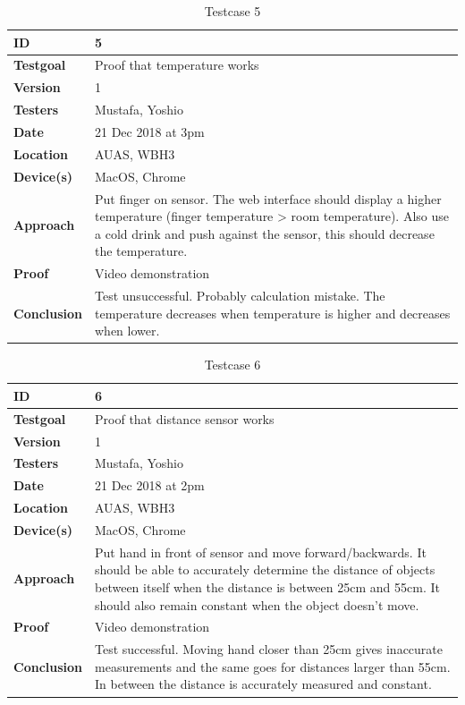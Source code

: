 \documentclass[12pt]{article}
\begin{document}
	\begin{table}[H]
		\centering
		\begin{tabularx}{\linewidth}{|X|X|}
			\hline
			\textbf{ID} &5\\
			\hline
			\textbf{Testgoal} &Proof that temperature works\\
			\hline
			\textbf{Version} &1\\
			\hline
			\textbf{Testers} &Mustafa, Yoshio\\
			\hline
			\textbf{Date} &21 Dec 2018 at 3pm\\
			\hline
			\textbf{Location} &AUAS, WBH3\\
			\hline
			\textbf{Device(s)} &MacOS, Chrome\\
			\hline
			\textbf{Approach} &Put finger on sensor. The web interface should display a higher temperature (finger temperature > room temperature). Also use a cold drink and push against the sensor, this should decrease the temperature.\\
			\hline
			\textbf{Proof} &Video demonstration\\
			\hline
			\textbf{Conclusion} &Test unsuccessful. Probably calculation mistake. The temperature decreases when temperature is higher and decreases when lower.\\
			\hline
		\end{tabularx}
		\caption{Testcase 5}
		\label{table:Testcase 5}   
	\end{table}
	\begin{table}[H]
		\centering
		\begin{tabularx}{\linewidth}{|X|X|}
			\hline
			\textbf{ID} &6\\
			\hline
			\textbf{Testgoal} &Proof that distance sensor works\\
			\hline
			\textbf{Version} &1\\
			\hline
			\textbf{Testers} &Mustafa, Yoshio\\
			\hline
			\textbf{Date} &21 Dec 2018 at 2pm\\
			\hline
			\textbf{Location} &AUAS, WBH3\\
			\hline
			\textbf{Device(s)} &MacOS, Chrome\\
			\hline
			\textbf{Approach} &Put hand in front of sensor and move forward/backwards. It should be able to accurately determine the distance of objects between itself when the distance is between 25cm and 55cm. It should also remain constant when the object doesn't move.\\
			\hline
			\textbf{Proof} &Video demonstration\\
			\hline
			\textbf{Conclusion} &Test successful. Moving hand closer than 25cm gives inaccurate measurements and the same goes for distances larger than 55cm. In between the distance is accurately measured and constant.\\
			\hline
		\end{tabularx}
		\caption{Testcase 6}
		\label{table:Testcase 6}   
	\end{table}
\end{document}
